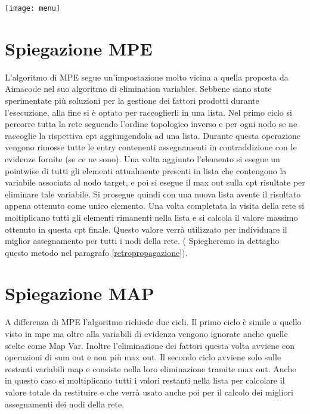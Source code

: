 \begin{minipage}{\linewidth}
	\centering
	\texttt{[image: menu]}
	\label{codice} 
\end{minipage}

\section{Spiegazione MPE}
L’algoritmo di MPE segue un’impostazione molto vicina a quella proposta da Aimacode nel suo algoritmo di elimination variables. 
Sebbene siano state sperimentate più soluzioni per la gestione dei fattori prodotti durante l’esecuzione, alla fine si è optato per raccoglierli in una lista. Nel primo ciclo si percorre tutta la rete seguendo l’ordine topologico inverso e per ogni nodo se ne raccoglie la rispettiva cpt aggiungendola ad una lista. Durante questa operazione vengono rimosse tutte le entry contenenti assegnamenti in contraddizione con le evidenze fornite (se ce ne sono). Una volta aggiunto l’elemento si esegue un pointwise di tutti gli elementi attualmente presenti in lista che contengono la variabile associata al nodo target, e poi si esegue il max out sulla cpt risultate per eliminare tale variabile. Si prosegue quindi con una nuova lista avente il risultato appena ottenuto come unico elemento. Una volta completata la visita della rete si moltiplicano tutti gli elementi rimanenti nella lista e si calcola il valore massimo ottenuto in questa cpt finale. Questo valore verrà utilizzato per individuare il miglior assegnamento per tutti i nodi della rete. ( Spiegheremo in dettaglio questo metodo nel paragrafo \ref{retropropagazione}).

\section{Spiegazione MAP}
A differenza di MPE l’algoritmo richiede due cicli. Il primo ciclo è simile a quello visto in mpe ma oltre alla variabili di evidenza vengono ignorate anche quelle scelte come Map Var. Inoltre l’eliminazione dei fattori questa volta avviene con operazioni di sum out e non più max out. Il secondo ciclo avviene solo sulle restanti variabili map e consiste nella loro eliminazione tramite max out. Anche in questo caso si moltiplicano tutti i valori restanti nella lista per calcolare il valore totale da restituire e che verrà usato anche poi per il calcolo dei migliori assegnamenti dei nodi della rete.

